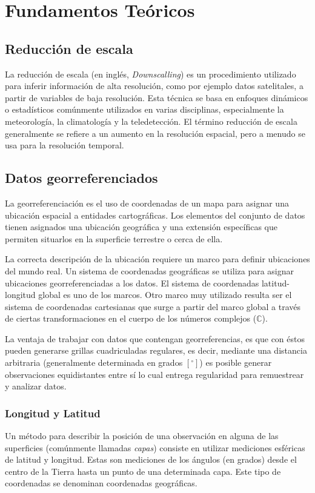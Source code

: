 \chapter{Fundamentos Teóricos}
\label{C2}
\section{Reducción de escala}
La reducción de escala (en inglés, \textit{Downscalling}) es un procedimiento utilizado para inferir 
información de alta resolución, como por ejemplo datos satelitales, a partir de variables de baja 
resolución. Esta técnica se basa en enfoques dinámicos o estadísticos comúnmente utilizados en varias 
disciplinas, especialmente la meteorología, la climatología y la teledetección. El término reducción 
de escala generalmente se refiere a un aumento en la resolución espacial, pero a menudo se usa para la 
resolución temporal.
%
%
%
%
\section{Datos georreferenciados}
La georreferenciación es el uso de coordenadas de un mapa para asignar una ubicación espacial a entidades
cartográficas. Los elementos del conjunto de datos tienen asignados una ubicación geográfica y una extensión específicas
que permiten situarlos en la superficie terrestre o cerca de ella.

La correcta descripción de la ubicación requiere un marco para definir ubicaciones del mundo real. Un sistema de coordenadas geográficas
se utiliza para asignar ubicaciones georreferenciadas a los datos. El sistema de coordenadas latitud-longitud global es uno de los marcos.
Otro marco muy utilizado resulta ser el sistema de coordenadas cartesianas que surge a partir del marco global a través de ciertas transformaciones
en el cuerpo de los números complejos ($\mathbb{C}$).

La ventaja de trabajar con datos que contengan georreferencias, es que con éstos pueden generarse grillas cuadriculadas regulares, es decir, mediante una distancia arbitraria (generalmente determinada en grados $[^{\circ}]$)
es posible generar observaciones equidistantes entre sí lo cual entrega regularidad para remuestrear y analizar datos.

    \subsection{Longitud y Latitud}
    Un método para describir la posición de una observación en alguna de las superficies (comúnmente llamadas \textit{capas}) consiste en utilizar 
    mediciones esféricas de latitud y longitud. Estas son mediciones de los ángulos (en grados) desde el centro de la Tierra hasta un punto de una determinada
    capa. Este tipo de coordenadas se denominan coordenadas geográficas.

